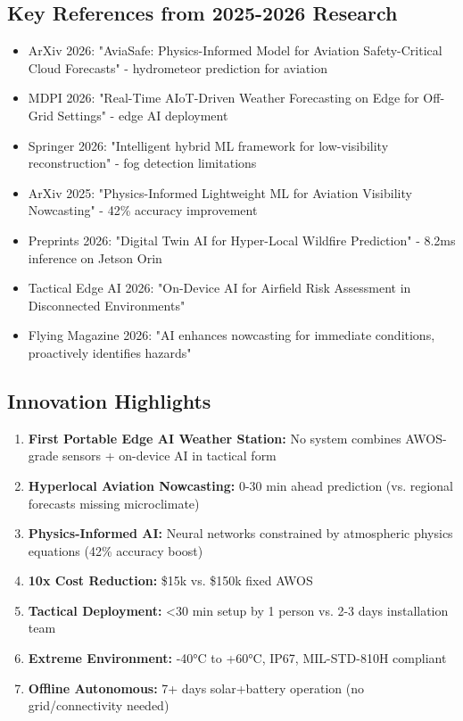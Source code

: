 \subsection{Key References from 2025-2026 Research}

\begin{itemize}
    \item ArXiv 2026: "AviaSafe: Physics-Informed Model for Aviation Safety-Critical Cloud Forecasts" - hydrometeor prediction for aviation
    \item MDPI 2026: "Real-Time AIoT-Driven Weather Forecasting on Edge for Off-Grid Settings" - edge AI deployment
    \item Springer 2026: "Intelligent hybrid ML framework for low-visibility reconstruction" - fog detection limitations
    \item ArXiv 2025: "Physics-Informed Lightweight ML for Aviation Visibility Nowcasting" - 42\% accuracy improvement
    \item Preprints 2026: "Digital Twin AI for Hyper-Local Wildfire Prediction" - 8.2ms inference on Jetson Orin
    \item Tactical Edge AI 2026: "On-Device AI for Airfield Risk Assessment in Disconnected Environments"
    \item Flying Magazine 2026: "AI enhances nowcasting for immediate conditions, proactively identifies hazards"
\end{itemize}

\subsection{Innovation Highlights}

\begin{enumerate}
    \item \textbf{First Portable Edge AI Weather Station:} No system combines AWOS-grade sensors + on-device AI in tactical form
    \item \textbf{Hyperlocal Aviation Nowcasting:} 0-30 min ahead prediction (vs. regional forecasts missing microclimate)
    \item \textbf{Physics-Informed AI:} Neural networks constrained by atmospheric physics equations (42\% accuracy boost)
    \item \textbf{10x Cost Reduction:} \$15k vs. \$150k fixed AWOS
    \item \textbf{Tactical Deployment:} <30 min setup by 1 person vs. 2-3 days installation team
    \item \textbf{Extreme Environment:} -40°C to +60°C, IP67, MIL-STD-810H compliant
    \item \textbf{Offline Autonomous:} 7+ days solar+battery operation (no grid/connectivity needed)
\end{enumerate}

